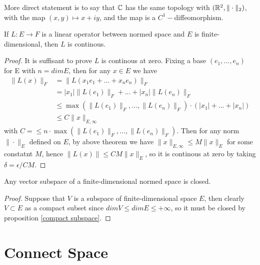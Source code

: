 \documentclass[en,hazy,blue,normal,12pt]{elegantnote}
\begin{document}
More direct statement is to say that \(\mathbb{C}\) has the same topology with \((\mathbb{R}^2,\|\cdot\|_2)\), with the map \((x,y) \mapsto x+iy\), and the map is a \(C^1-\)diffeomorphism.
\begin{corollary}
    If \(L:E \to F\) is a linear operator between normed space and \(E\) is finite-dimensional, then \(L\) is continous.

    \begin{proof}
        It is suffisant to prove \(L\) is continous at zero. Fixing a base \((e_1,...,e_n)\) for E  with \(n = dim E\), then for any \(x\in E\) we have 
        \begin{align*}
            \|L(x)\|_F &= \|L(x_1e_1+...+x_ne_n)\|_F \\
            &= |x_1|\|L(e_1)\|_F+...+|x_n|\|L(e_n)\|_F \\
            &\leq \max(\|L(e_1)\|_F,...,\|L(e_n)\|_F) \cdot (|x_1|+...+|x_n|) \\
            &\leq C\|x\|_{E,\infty}
        \end{align*}
        with \(C = \leq n\cdot\max(\|L(e_1)\|_F,...,\|L(e_n)\|_F)\). Then for any norm \(\|\cdot\|_E\) defined on \(E\), by above theorem we have \(\|x\|_{E,\infty} \leq M\|x\|_E\) for some constatnt \(M\), hence \(\|L(x)\| \leq CM\|x\|_E\), so it is continous at zero by taking \(\delta = \epsilon/CM\).
    \end{proof}
\end{corollary}


\begin{corollary}
    Any vector subspace of a finite-dimensional normed space is closed.
    \begin{proof}
        Suppose that \(V\) is a subspace of finite-dimensional space \(E\), then clearly \(V \subset E\) as a compact subset since \(dimV \leq dimE \leq +\infty\), so it must be closed by proposition \ref{compact subspace}.
    \end{proof}
\end{corollary}



\section{Connect Space}
\end{document}

